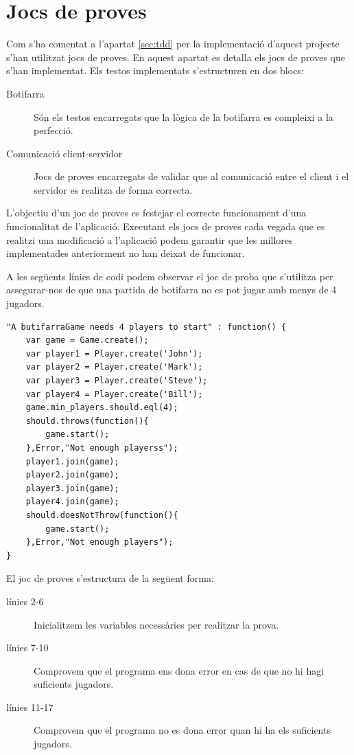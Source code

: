 \section{Jocs de proves}

Com s'ha comentat a l'apartat \ref{sec:tdd} per la implementació d'aquest projecte s'han utilitzat jocs de proves. En aquest apartat es detalla els jocs de proves que s'han implementat. Els testos implementats s'estructuren en dos blocs: 

\begin{description}
    \item[Botifarra]{ Són els testos encarregats que la lògica de la botifarra es compleixi a la perfecció.}
    \item[Comunicació client-servidor] {Jocs de proves encarregats de validar que al comunicació entre el client i el servidor es realitza de forma correcta.}
\end{description}

L'objectiu d'un joc de proves es festejar el correcte funcionament d'una funcionalitat de l'aplicació. Executant els jocs de proves cada vegada que es realitzi una modificació a l'aplicació podem garantir que les millores implementades anteriorment no han deixat de funcionar. 

A les següents línies de codi podem observar el joc de proba que s'utilitza per assegurar-nos de que una partida de botifarra no es pot jugar amb menys de 4 jugadors. 

\begin{lstlisting}
"A butifarraGame needs 4 players to start" : function() {
    var game = Game.create();
    var player1 = Player.create('John');
    var player2 = Player.create('Mark');
    var player3 = Player.create('Steve');
    var player4 = Player.create('Bill');
    game.min_players.should.eql(4);
    should.throws(function(){
        game.start();
    },Error,"Not enough playerss");
    player1.join(game);
    player2.join(game);
    player3.join(game);
    player4.join(game);
    should.doesNotThrow(function(){
        game.start();
    },Error,"Not enough players");      
}
\end{lstlisting}

El joc de proves s'estructura de la següent forma:

\begin{description}
    \item[línies 2-6]{Inicialitzem les variables necessàries per realitzar la prova.}
    \item[línies 7-10]{Comprovem que el programa ens dona error en cas de que no hi hagi suficients jugadors.}
    \item[línies 11-17]{Comprovem que el programa no es dona error quan hi ha els suficients jugadors.}
\end{description}

